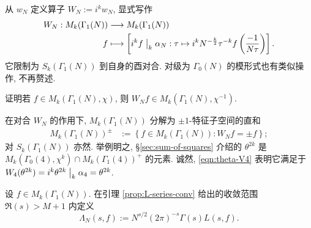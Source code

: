 \begin{definition}\label{def:Fricke-involution}
	 
	从 $w_N$ 定义算子 $W_N := i^k w_N$, 显式写作
	\begin{align*}
		W_N: M_k(\Gamma_1(N)) & \longrightarrow M_k(\Gamma_1(N)) \\
		f & \longmapsto \left[ i^k f \;\big|_{k} \; \alpha_N : \tau \mapsto i^k N^{-\frac{k}{2}} \tau^{-k} f\left( \dfrac{-1}{N\tau} \right) \right].
	\end{align*}
	它限制为 $S_k(\Gamma_1(N))$ 到自身的酉对合. 对级为 $\Gamma_0(N)$ 的模形式也有类似操作, 不再赘述.
\end{definition}

\begin{exercise}
	证明若 $f \in M_k(\Gamma_1(N), \chi)$, 则 $W_N f \in M_k(\Gamma_1(N), \chi^{-1})$.
\end{exercise}

在对合 $W_N$ 的作用下, $M_k(\Gamma_1(N))$ 分解为 $\pm 1$-特征子空间的直和
\begin{align*}
	M_k(\Gamma_1(N))^\pm & := \left\{ f \in M_k(\Gamma_1(N)): W_N f = \pm f \right\};
\end{align*}
对 $S_k(\Gamma_1(N))$ 亦然. 举例明之, \S\ref{sec:sum-of-squares} 介绍的 $\theta^{2k}$ 是 $M_k(\Gamma_0(4), \chi^k) \cap M_k(\Gamma_1(4))^+$ 的元素. 诚然, \eqref{eqn:theta-V4} 表明它满足于 $W_4(\theta^{2k}) = i^k \theta^{2k} \;\big|_{k} \; \alpha_4 = \theta^{2k}$.

\begin{definition} 
	设 $f \in M_k(\Gamma_1(N))$. 在引理 \ref{prop:L-series-conv} 给出的收敛范围 $\Re(s) > M+1$ 内定义
	\[ \Lambda_N(s,f) := N^{s/2} (2\pi)^{-s} \Gamma(s) L(s,f). \]
\end{definition}

